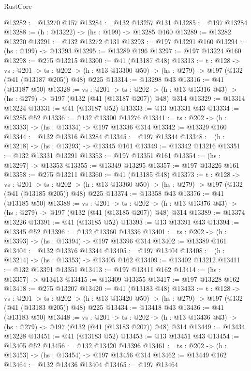 \begin{lexlean}{RustCore}
\begin{coremodule}
@13282 := @13270 @157
@13284 := @132 @13257 @131
@13285 := @197 @13284
@13288 := (h : @13222) -> (hs : @199) -> @13285 @160
@13289 := @13282 @13220
@13291 := @132 @13272 @131
@13293 := @197 @13291 @160
@13294 := (hs : @199) -> @13293
@13295 := @13289 @196
@13297 := @197 @13224 @160
@13298 := @275 @13215
@13300 := @41 (@13187 @48)
@13313 := {t : @128} ->
  {vs : @201} ->
  {ts : @202} -> (h : @13 @13300 @50) -> (hs : @279) -> @197 (@132 (@41 (@13187 @205)) @48) @225
@13314 := @13298 @43
@13316 := @41 (@13187 @50)
@13328 := {vs : @201} ->
  {ts : @202} -> (h : @13 @13316 @43) -> (hs : @279) -> @197 (@132 (@41 (@13187 @207)) @48) @314
@13329 := @13314 @13224
@13331 := @41 (@13187 @52)
@13333 := @13 @13331 @43
@13334 := @13285 @52
@13336 := @132 @13300 @13276
@13341 := {ts : @202} -> (h : @13333) -> (hs : @13334) -> @197 @13336 @314
@13342 := @13329 @160
@13344 := @132 @13316 @13284
@13345 := @197 @13344
@13348 := (h : @13218) -> (hs : @13293) -> @13345 @161
@13349 := @13342 @13216
@13351 := @132 @13331 @13291
@13353 := @197 @13351 @161
@13354 := (hs : @13297) -> @13353
@13355 := @13349 @13295
@13357 := @197 @13226 @161
@13358 := @275 @13211
@13360 := @41 (@13185 @48)
@13373 := {t : @128} ->
  {vs : @201} ->
  {ts : @202} -> (h : @13 @13360 @50) -> (hs : @279) -> @197 (@132 (@41 (@13185 @205)) @48) @225
@13374 := @13358 @43
@13376 := @41 (@13185 @50)
@13388 := {vs : @201} ->
  {ts : @202} -> (h : @13 @13376 @43) -> (hs : @279) -> @197 (@132 (@41 (@13185 @207)) @48) @314
@13389 := @13374 @13226
@13391 := @41 (@13185 @52)
@13393 := @13 @13391 @43
@13394 := @13345 @52
@13396 := @132 @13360 @13336
@13401 := {ts : @202} -> (h : @13393) -> (hs : @13394) -> @197 @13396 @314
@13402 := @13389 @161
@13404 := @132 @13376 @13344
@13405 := @197 @13404
@13408 := (h : @13214) -> (hs : @13353) -> @13405 @162
@13409 := @13402 @13212
@13411 := @132 @13391 @13351
@13413 := @197 @13411 @162
@13414 := (hs : @13357) -> @13413
@13415 := @13409 @13355
@13417 := @197 @13228 @162
@13418 := @275 @13207
@13420 := @41 (@13183 @48)
@13433 := {t : @128} ->
  {vs : @201} ->
  {ts : @202} -> (h : @13 @13420 @50) -> (hs : @279) -> @197 (@132 (@41 (@13183 @205)) @48) @225
@13434 := @13418 @43
@13436 := @41 (@13183 @50)
@13448 := {vs : @201} ->
  {ts : @202} -> (h : @13 @13436 @43) -> (hs : @279) -> @197 (@132 (@41 (@13183 @207)) @48) @314
@13449 := @13434 @13228
@13451 := @41 (@13183 @52)
@13453 := @13 @13451 @43
@13454 := @13405 @52
@13456 := @132 @13420 @13396
@13461 := {ts : @202} -> (h : @13453) -> (hs : @13454) -> @197 @13456 @314
@13462 := @13449 @162
@13464 := @132 @13436 @13404
@13465 := @197 @13464

\end{coremodule}
\end{lexlean}
